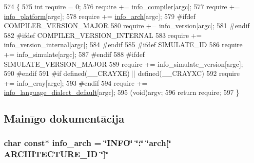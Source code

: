 \begin{DoxyCode}
574 \{
575   \textcolor{keywordtype}{int} require = 0;
576   require += \hyperlink{build_2_c_make_files_23_85_81_2_compiler_id_c_2_c_make_c_compiler_id_8c_a4b0efeb7a5d59313986b3a0390f050f6}{info\_compiler}[argc];
577   require += \hyperlink{build_2_c_make_files_23_85_81_2_compiler_id_c_2_c_make_c_compiler_id_8c_a2321403dee54ee23f0c2fa849c60f7d4}{info\_platform}[argc];
578   require += \hyperlink{build_2_c_make_files_23_85_81_2_compiler_id_c_2_c_make_c_compiler_id_8c_a59647e99d304ed33b15cb284c27ed391}{info\_arch}[argc];
579 \textcolor{preprocessor}{#ifdef COMPILER\_VERSION\_MAJOR}
580   require += info\_version[argc];
581 \textcolor{preprocessor}{#endif}
582 \textcolor{preprocessor}{#ifdef COMPILER\_VERSION\_INTERNAL}
583   require += info\_version\_internal[argc];
584 \textcolor{preprocessor}{#endif}
585 \textcolor{preprocessor}{#ifdef SIMULATE\_ID}
586   require += info\_simulate[argc];
587 \textcolor{preprocessor}{#endif}
588 \textcolor{preprocessor}{#ifdef SIMULATE\_VERSION\_MAJOR}
589   require += info\_simulate\_version[argc];
590 \textcolor{preprocessor}{#endif}
591 \textcolor{preprocessor}{#if defined(\_\_CRAYXE) || defined(\_\_CRAYXC)}
592   require += info\_cray[argc];
593 \textcolor{preprocessor}{#endif}
594   require += \hyperlink{build_2_c_make_files_23_85_81_2_compiler_id_c_2_c_make_c_compiler_id_8c_a1ce162bad2fe6966ac8b33cc19e120b8}{info\_language\_dialect\_default}[argc];
595   (void)argv;
596   \textcolor{keywordflow}{return} require;
597 \}
\end{DoxyCode}


\subsection{Mainīgo dokumentācija}
\subsubsection[{\texorpdfstring{info\+\_\+arch}{info_arch}}]{\setlength{\rightskip}{0pt plus 5cm}char const$\ast$ info\+\_\+arch = \char`\"{}I\+N\+FO\char`\"{} \char`\"{}\+:\char`\"{} \char`\"{}arch\mbox{[}\char`\"{} A\+R\+C\+H\+I\+T\+E\+C\+T\+U\+R\+E\+\_\+\+ID \char`\"{}\mbox{]}\char`\"{}}\hypertarget{cmake-build-release_2_c_make_files_23_810_82_2_compiler_id_c_2_c_make_c_compiler_id_8c_a59647e99d304ed33b15cb284c27ed391}{}\label{cmake-build-release_2_c_make_files_23_810_82_2_compiler_id_c_2_c_make_c_compiler_id_8c_a59647e99d304ed33b15cb284c27ed391}


